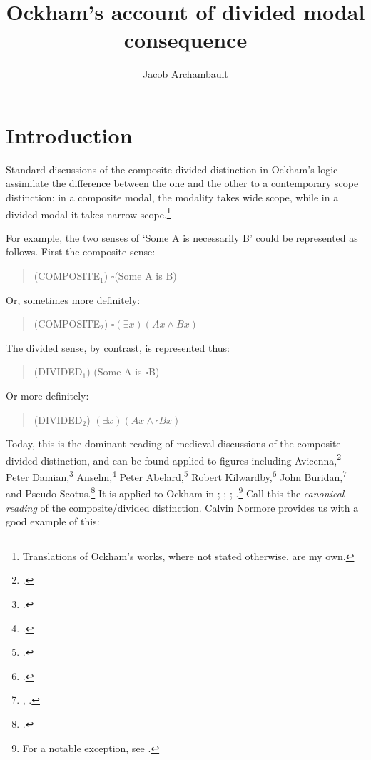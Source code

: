 \documentclass[a4paper]{article}
\title{Ockham's account of divided modal consequence}
\author{Jacob Archambault}
\begin{document}
\maketitle

\begin{abstract}
\end{abstract}

\section{Introduction}
Standard discussions of the composite-divided distinction in Ockham's logic assimilate the difference between the one and the other to a contemporary scope distinction: in a composite modal, the modality takes wide scope, while in a divided modal it takes narrow scope.\footnote{Translations of Ockham's works, where not stated otherwise, are my own.}

For example, the two senses of `Some A is necessarily B' could be represented as follows. First the composite sense: 

\begin{quote}
(COMPOSITE$_{1}$) $\square$(Some A is B)
\end{quote}

\noindent Or, sometimes more definitely:

\begin{quote}
(COMPOSITE$_{2}$) $\square(\exists x)(Ax \wedge Bx)$
\end{quote}

The divided sense, by contrast, is represented thus:

\begin{quote}
(DIVIDED$_{1}$) (Some A is $\square$B)
\end{quote}

\noindent Or more definitely:

\begin{quote}
(DIVIDED$_{2}$) $(\exists x)(Ax \wedge \square Bx)$
\end{quote}

Today, this is the dominant reading of medieval discussions of the composite-divided distinction, and can be found applied to figures including Avicenna,\footnote{\cite{Chatti2015}.} Peter Damian,\footnote{\cite{Marenbon2008}.} Anselm,\footnote{\cite{Roark2003}.} Peter Abelard,\footnote{\cite{Wilks2008}.} Robert Kilwardby,\footnote{\cite{Thom2007}.} John Buridan,\footnote{\cite{Parsons2008}, \cite{Johnston2015b}.} and Pseudo-Scotus.\footnote{\cite{McDermott1972}.} It is applied to Ockham in \cite{PriestRead1981}; \cite{Read2007} \cite[p. 350]{DutilhNovaes2007}; \cite[p. 298]{Parsons2014}; \cite[pp. 237-238]{Johnston2015}.\footnote{For a notable exception, see \cite[p. 62]{Panaccio1999}.} Call this the \textit{canonical reading} of the composite/divided distinction. Calvin Normore provides us with a good example of this:
\end{document}
